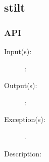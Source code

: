 %
%
%
%
%              

\subsection{stilt}
\label{stilt}

\subsubsection{API}
\begin{description}
\label{stilt_}
\item[{\cfunc[]{stilt\_}{}}: ]
	\begin{description}\item[]
	\item[Input(s): ]
		\begin{description}\item[]
		\item[: ]
		\end{description}
	\item[Output(s): ]
		\begin{description}\item[]
		\item[: ]
		\end{description}
	\item[Exception(s): ]
		\begin{description}\item[]
		\item[.]
		\end{description}
	\item[Description: ]
	\end{description}
\end{description}
